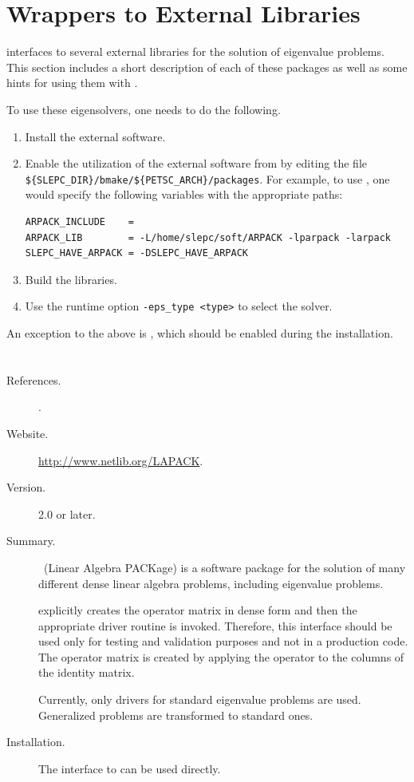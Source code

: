 \section{Wrappers to External Libraries}
\label{sec:wrap}

	\slepc interfaces to several external libraries for the solution of eigenvalue problems. This section includes a short description of each of these packages as well as some hints for using them with \slepc.

	To use these eigensolvers, one needs to do the following.
	\begin{enumerate}
	\item Install the external software.
	\item Enable the utilization of the external software from \slepc by editing the file \Verb!${SLEPC_DIR}/bmake/${PETSC_ARCH}/packages!. For example, to use \arpack, one would specify the following variables with the appropriate paths:
	\begin{Verbatim}[fontsize=\small]
ARPACK_INCLUDE    = 
ARPACK_LIB        = -L/home/slepc/soft/ARPACK -lparpack -larpack
SLEPC_HAVE_ARPACK = -DSLEPC_HAVE_ARPACK
	\end{Verbatim}
	\item Build the \slepc libraries.
	\item Use the runtime option \Verb!-eps_type <type>! to select the solver.
	\end{enumerate}

	An exception to the above is \lapack, which should be enabled during the \petsc{} installation.

\section*{\underline{\lapack}}
	\begin{description}
	\item[References.]\citep{Anderson:1992:LUG}.
	\item[Website.] \url{http://www.netlib.org/LAPACK}.
	\item[Version.] 2.0 or later.
	\item[Summary.] \lapack\ (Linear Algebra PACKage) is a software package for the solution of many different dense linear algebra problems, including eigenvalue problems.

	\slepc explicitly creates the operator matrix in dense form and then the appropriate \lapack{} driver routine is invoked. Therefore, this interface should be used only for testing and validation purposes and not in a production code. The operator matrix is created by applying the operator to the columns of the identity matrix.

	Currently, only \lapack{} drivers for standard eigenvalue problems are
used. Generalized problems are transformed to standard ones.
	
	\item[Installation.]
	The \slepc interface to \lapack{} can be used directly.
	\end{description}

